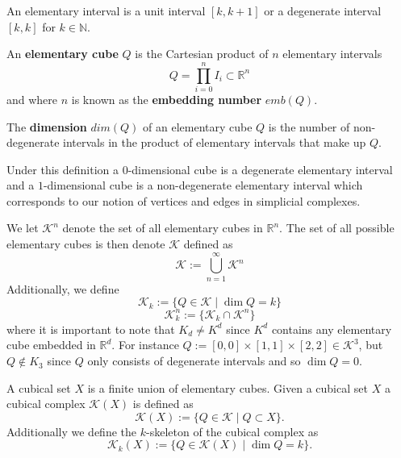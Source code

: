 \begin{example}
\begin{definition}
An elementary interval is a unit interval $[k,k+1]$ or a degenerate interval $[k,k]$ for $k \in \mathbb{N}$.
\end{definition}

\begin{definition}
  An \textbf{elementary cube} $Q$ is the Cartesian product of $n$ elementary intervals
  \[Q = \prod^{n}_{i=0} I_{i} \subset \mathbb{R}^{n}\]
  and where $n$ is known as the \textbf{embedding number} $emb(Q)$.
\end{definition}

\begin{definition}
The \textbf{dimension} $dim(Q)$ of an elementary cube $Q$ is the number of non-degenerate intervals in the product of elementary intervals that make up $Q$.
\end{definition}

Under this definition a $0$-dimensional cube is a degenerate elementary interval and a $1$-dimensional cube is a non-degenerate elementary interval which corresponds to our notion of vertices and edges in simplicial complexes.

We let $\mathcal{K}^{n}$ denote the set of all elementary cubes in $\mathbb{R}^{n}$. The set of all possible elementary cubes is then denote $\mathcal{K}$ defined as
\[ \mathcal{K}:= \bigcup^{\infty}_{n=1} \mathcal{K}^{n} \]
Additionally, we define
\[ \mathcal{K}_{k} := \{ Q \in \mathcal{K} \mid \dim Q = k \}\]
\[ \mathcal{K}^{n}_{k} := \{ \mathcal{K}_{k} \cap \mathcal{K}^{n} \}\]
where it is important to note that $K_{d} \neq K^{d}$ since $K^{d}$ contains any elementary cube embedded in $\mathbb{R}^{d}$. For instance $Q:=[0,0] \times [1,1] \times [2,2] \in \mathcal{K}^{3}$, but $Q \not \in K_{3}$ since $Q$ only consists of degenerate intervals and so $\dim Q = 0$.


\begin{definition}
  A cubical set $X$ is a finite union of elementary cubes. Given a cubical set $X$ a cubical complex $\mathcal{K}(X)$ is defined as
  \[ \mathcal{K}(X):= \{Q \in \mathcal{K} \mid Q \subset X\}.\]
  Additionally we define the $k$-skeleton of the cubical complex as
  \[ \mathcal{K}_{k}(X):= \{ Q \in \mathcal{K}(X) \mid \dim Q = k \}.\]
\end{definition}


\end{example}
